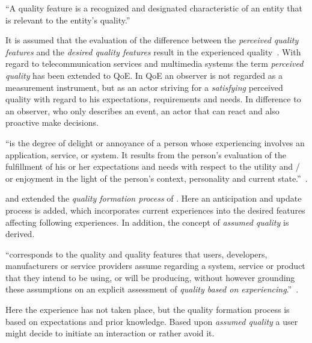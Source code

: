 \begin{definition}
``A quality feature is a recognized and designated characteristic of an entity that is relevant to the entity's quality.''~\citep[][p.~17]{jekosch_voice_2005}
\end{definition}

It is assumed that the evaluation of the difference between the \emph{perceived quality features} and the \emph{desired quality features} result in the experienced quality~\citet[p.~23]{moller_quality_2014}.
With regard to telecommunication services and multimedia systems the term \emph{perceived quality} has been extended to \acf{QoE}.
In \ac{QoE} an observer is not regarded as a measurement instrument, but as an actor striving for a \emph{satisfying} perceived quality with regard to his expectations, requirements and needs.
In difference to an observer, who only describes an event, an actor that can react and also proactive make decisions.

\begin{definition}
``is the degree of delight or annoyance of a person whose experiencing involves an application, service, or system.
It results from the person’s evaluation of the fulfillment of his or her expectations and needs with respect to the utility and / or enjoyment in the light of the person’s context, personality and current state.''~\citep[][p.~19]{raake_quality_2014}.
\end{definition}

\citet{raake_speech_2006} and \citet{raake_quality_2014} extended the \emph{quality formation process} of \citet{jekosch_voice_2005}.
Here an anticipation and update process is added, which incorporates current experiences into the desired features affecting following experiences.
In addition, the concept of \emph{assumed quality} is derived.
\begin{definition}\label{def:assumedquality}
``corresponds to the quality and quality features that users, developers, manufacturers or service providers assume regarding a system, service or product that they intend to be using, or will be producing, without however grounding these assumptions on an explicit assessment of \textit{quality based on experiencing}.''~\citep[][p.~17]{raake_quality_2014}.
\end{definition}
Here the experience has not taken place, but the quality formation process is based on expectations and prior knowledge.
Based upon \emph{assumed quality} a user might decide to initiate an interaction or rather avoid it.

